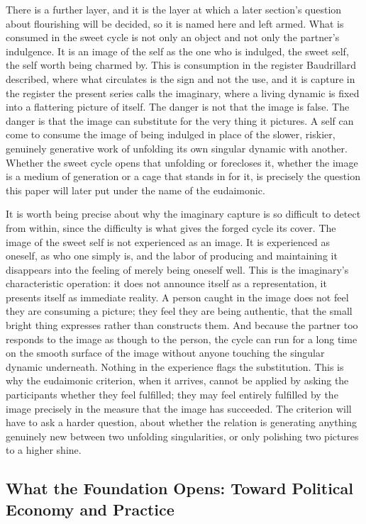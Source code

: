 There is a further layer, and it is the layer at which a later section's question about flourishing will be decided, so it is named here and left armed. What is consumed in the sweet cycle is not only an object and not only the partner's indulgence. It is an image of the self as the one who is indulged, the sweet self, the self worth being charmed by. This is consumption in the register Baudrillard described, where what circulates is the sign and not the use, and it is capture in the register the present series calls the imaginary, where a living dynamic is fixed into a flattering picture of itself. The danger is not that the image is false. The danger is that the image can substitute for the very thing it pictures. A self can come to consume the image of being indulged in place of the slower, riskier, genuinely generative work of unfolding its own singular dynamic with another. Whether the sweet cycle opens that unfolding or forecloses it, whether the image is a medium of generation or a cage that stands in for it, is precisely the question this paper will later put under the name of the eudaimonic.

It is worth being precise about why the imaginary capture is so difficult to detect from within, since the difficulty is what gives the forged cycle its cover. The image of the sweet self is not experienced as an image. It is experienced as oneself, as who one simply is, and the labor of producing and maintaining it disappears into the feeling of merely being oneself well. This is the imaginary's characteristic operation: it does not announce itself as a representation, it presents itself as immediate reality. A person caught in the image does not feel they are consuming a picture; they feel they are being authentic, that the small bright thing expresses rather than constructs them. And because the partner too responds to the image as though to the person, the cycle can run for a long time on the smooth surface of the image without anyone touching the singular dynamic underneath. Nothing in the experience flags the substitution. This is why the eudaimonic criterion, when it arrives, cannot be applied by asking the participants whether they feel fulfilled; they may feel entirely fulfilled by the image precisely in the measure that the image has succeeded. The criterion will have to ask a harder question, about whether the relation is generating anything genuinely new between two unfolding singularities, or only polishing two pictures to a higher shine.

\subsection{What the Foundation Opens: Toward Political Economy and Practice}

